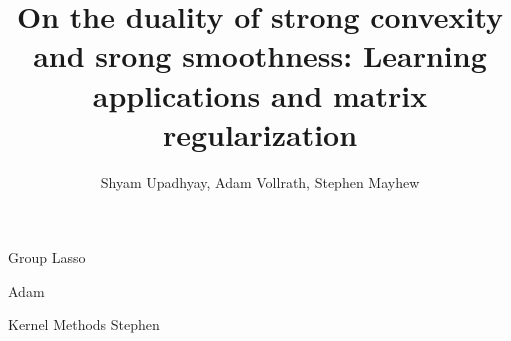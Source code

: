 \documentclass[11pt]{beamer}
\author{Shyam Upadhyay, Adam Vollrath, Stephen Mayhew}
\title{On the duality of strong convexity and srong smoothness: Learning applications and matrix regularization}
\institute{UIUC}
\date{}
\begin{document}
{\nologo
\begin{frame}
\titlepage
\end{frame}
}




\begin{frame}{Group Lasso}

Adam

\end{frame}

\begin{frame}{Kernel Methods}
Stephen

\end{frame}
\end{document}
